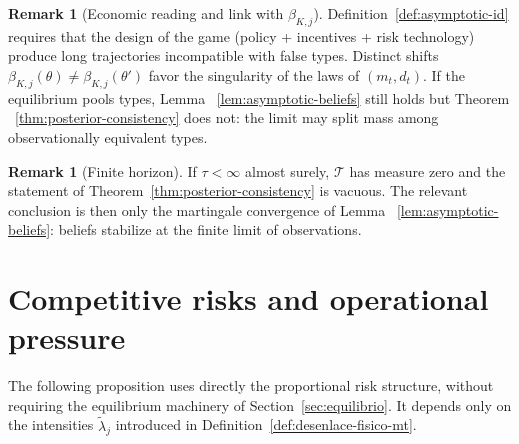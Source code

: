 \documentclass[ecta,nameyear,final,supplement]{econsocart}
\numberwithin{equation}{section}
\numberwithin{table}{section}
\theoremstyle{definition}
\newtheorem{remark}[theorem]{Remark}
\begin{document}
\begin{remark}[Economic reading and link with $\beta_{K,j}$]
\label{rem:lectura-beta}
Definition~\ref{def:asymptotic-id} requires that the design of the game
(policy + incentives + risk technology) produce long trajectories incompatible
with false types. Distinct shifts
$\beta_{K,j}(\theta)\neq\beta_{K,j}(\theta')$ favor the singularity of
the laws of $(m_t,d_t)$. If the equilibrium pools types, Lemma
~\ref{lem:asymptotic-beliefs} still holds but Theorem
~\ref{thm:posterior-consistency} does not: the limit may split mass among
observationally equivalent types.
\end{remark}

\begin{remark}[Finite horizon]
\label{rmk:horizonte-finito}
If $\tau<\infty$ almost surely, $\mathcal{T}$ has measure zero and the
statement of Theorem~\ref{thm:posterior-consistency} is vacuous. The relevant
conclusion is then only the martingale convergence of Lemma
~\ref{lem:asymptotic-beliefs}: beliefs stabilize at the finite limit of
observations.
\end{remark}

\section{Competitive risks and operational pressure}
\label{sec:riesgos}

\noindent The following proposition uses directly the proportional risk
structure, without requiring the equilibrium machinery of
Section~\ref{sec:equilibrio}. It depends only on the intensities
$\tilde\lambda_j$ introduced in Definition~\ref{def:desenlace-fisico-mt}.

\end{document}

